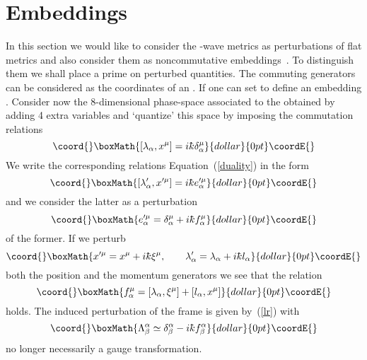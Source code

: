\documentclass[12pt,a4paper]{article}
\def\b#1{{\mathbb #1}}
\def\kbar{{\mathchar'26\mkern-9muk}}
\providecommand{\initiate}{\setcounter{equation}{0}}
\begin{document}
\initiate
\section{Embeddings}

In this section we would like to consider the \coordHE{}-wave metrics as
perturbations of flat metrics and also consider them as noncommutative
embeddings~\cite{MadMou98,GraLizMarVit01}. To distinguish them we
shall place a prime on perturbed quantities.
The commuting generators can be considered as the coordinates of an
\myHighlight{$\b{R}^4$}\coordHE{}. If \coordHE{} one can set \coordHE{} to
define an embedding \myHighlight{$\b{R}^2 \hookrightarrow \b{R}^4$}\coordHE{}. Consider now
the 8-dimensional phase-space associated to the \myHighlight{$\b{R}^4$}\coordHE{} obtained by
adding 4 extra variables \coordHE{} and `quantize' this
space by imposing the commutation relations
$$\coord{}\boxMath{
[\lambda_\alpha, x^\mu] = i \kbar \delta_\alpha^\mu
}{dollar}{0pt}\coordE{}$$
We write the corresponding relations Equation~(\ref{duality}) in the
form
$$\coord{}\boxMath{
[\lambda^\prime_\alpha, x^{\prime\mu}] = i \kbar e_\alpha^{\prime\mu}
}{dollar}{0pt}\coordE{}$$
and we consider the latter as a perturbation
$$\coord{}\boxMath{
e_\alpha^{\prime\mu} = \delta_\alpha^\mu + i\kbar f_\alpha^{\mu}
}{dollar}{0pt}\coordE{}$$
of the former. If we perturb 
$$\coord{}\boxMath{
x^{\prime\mu} = x^\mu + i\kbar \xi^\mu, \qquad 
\lambda^\prime_\alpha = \lambda_\alpha + i\kbar l_\alpha 
}{dollar}{0pt}\coordE{}$$
both the position and the momentum generators we see that the relation 
$$\coord{}\boxMath{
f^{\mu}_\alpha = [\lambda_\alpha, \xi^\mu] + [l_\alpha, x^\mu]
}{dollar}{0pt}\coordE{}$$
holds. The induced perturbation of the frame is given by~(\ref{lr}) with
$$\coord{}\boxMath{
\Lambda^\alpha_\beta \simeq \delta^\alpha_\beta - i\kbar f^\alpha_\beta
}{dollar}{0pt}\coordE{}$$
no longer necessarily a gauge transformation.
\end{document}
